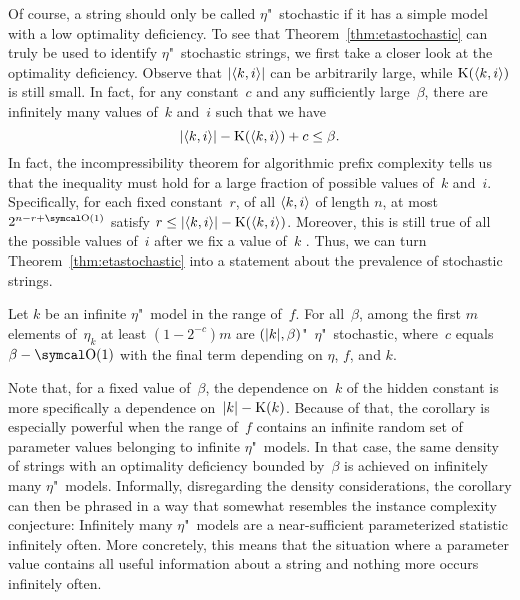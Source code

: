 Of course, a string should only be called $\eta$"~stochastic if it has a simple model with a low optimality deficiency.
To see that Theorem~\ref{thm:etastochastic} can truly be used to identify $\eta$"~stochastic strings, we first take a closer look at the optimality deficiency.
Observe that ${\lvert{\langle k, i\rangle}\rvert}$ can be arbitrarily large, while $\operatorname{K}({\langle k, i\rangle})$ is still small.
In fact, for any constant~$c$ and any sufficiently large~$\beta$, there are infinitely many values of~$k$ and~$i$ such that we have
\begin{equation*}
  {\lvert{\langle k, i\rangle}\rvert} - \operatorname{K}({\langle k, i\rangle}) + c \le \beta.
\end{equation*}
In fact, the incompressibility theorem for algorithmic prefix complexity \parencite[][Theorem~3.3.1(ii)]{li2008introduction} tells us that the inequality must hold for a large fraction of possible values of~$k$ and~$i$.
Specifically, for each fixed constant~$r$, of all ${\langle k, i\rangle}$ of length $n$, at most $2^{n - r + \bigO(1)}$ satisfy $r \le {\lvert{\langle k, i\rangle}\rvert} - \operatorname{K}({\langle k, i\rangle})$.
Moreover, this is still true of all the possible values of~$i$ after we fix a value of~$k$ \parencite[][Theorem~3.9.1]{li2008introduction}.
Thus, we can turn Theorem~\ref{thm:etastochastic} into a statement about the prevalence of stochastic strings.
\begin{corollary}
\label{cor:stochastic}%
  Let $k$ be an infinite $\eta$"~model in the range of~$f$.
  For all~$\beta$, among the first $m$ elements of~$\eta_k$ at least $(1 - 2^{-c})m$ are $({\lvert k\rvert}, \beta)$"~$\eta$"~stochastic, where~$c$ equals $\beta - \bigO(1)$ with the final term depending on $\eta$, $f$, and $k$.
\end{corollary}
Note that, for a fixed value of~$\beta$, the dependence on~$k$ of the hidden constant is more specifically a dependence on~${\lvert k\rvert} - \operatorname{K}(k)$.
Because of that, the corollary is especially powerful when the range of~$f$ contains an infinite random set of parameter values belonging to infinite $\eta$"~models.
In that case, the same density of strings with an optimality deficiency bounded by~$\beta$ is achieved on infinitely many $\eta$"~models.
Informally, disregarding the density considerations, the corollary can then be phrased in a way that somewhat resembles the instance complexity conjecture:
Infinitely many $\eta$"~models are a near-sufficient parameterized statistic infinitely often.
More concretely, this means that the situation where a parameter value contains all useful information about a string and nothing more occurs infinitely often.

